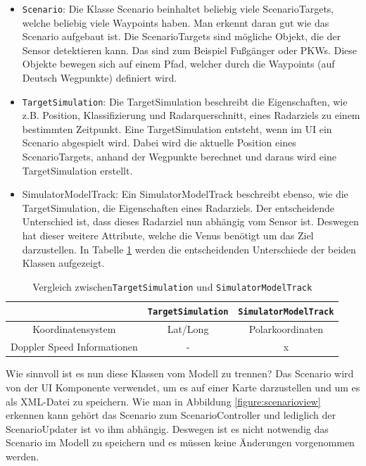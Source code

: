 \begin{itemize}
    \item \texttt{Scenario}: Die Klasse Scenario beinhaltet beliebig viele ScenarioTargets, welche beliebig viele Waypoints haben. Man erkennt daran gut wie das Scenario aufgebaut ist. Die ScenarioTargets sind mögliche Objekt, die der Sensor detektieren kann. Das sind zum Beispiel Fußgänger oder PKWs. Diese Objekte bewegen sich auf einem Pfad, welcher durch die Waypoints (auf Deutsch Wegpunkte) definiert wird.
    \item \texttt{TargetSimulation}:  Die TargetSimulation beschreibt die Eigenschaften, wie z.B. Position, Klassifizierung und Radarquerschnitt, eines Radarziels zu einem bestimmten Zeitpunkt. Eine TargetSimulation entsteht, wenn im UI ein Scenario abgespielt wird. Dabei wird die aktuelle Position eines ScenarioTargets, anhand der Wegpunkte berechnet und daraus wird eine TargetSimulation erstellt.
    \item SimulatorModelTrack: Ein SimulatorModelTrack beschreibt ebenso, wie die TargetSimulation, die Eigenschaften eines Radarziels. Der entscheidende Unterschied ist, dass dieses Radarziel nun abhängig vom Sensor ist. Deswegen hat dieser weitere Attribute, welche die Venus benötigt um das Ziel darzustellen. In Tabelle \ref{table:1} werden die entscheidenden Unterschiede der beiden Klassen aufgezeigt.    
\end{itemize}

\begin{table}[h]
    \begin{tabular}{ |c|c|c| } 
        \hline
         & \texttt{TargetSimulation} & \texttt{SimulatorModelTrack} \\ 
        \hline
        Koordinatensystem & Lat/Long & Polarkoordinaten \\ 
        \hline
        Doppler Speed Informationen & - & x \\ 
        \hline
        
   \end{tabular}
   \caption{Vergleich zwischen\texttt{TargetSimulation} und \texttt{SimulatorModelTrack}}
   \label{table:1}
\end{table}

Wie sinnvoll ist es nun diese Klassen vom Modell zu trennen? Das Scenario wird von der UI Komponente verwendet, um es auf einer Karte darzustellen und um es als XML-Datei zu speichern. Wie man in Abbildung \ref{figure:scenarioview} erkennen kann gehört das Scenario zum ScenarioController und lediglich der ScenarioUpdater ist vo ihm abhängig. Deswegen ist es nicht notwendig das Scenario im Modell zu speichern und es müssen keine Änderungen vorgenommen werden.

